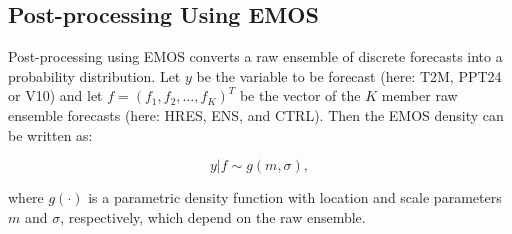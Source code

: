 \subsection{Post-processing Using EMOS}
Post-processing using EMOS converts a raw ensemble of discrete
forecasts into a probability distribution. Let $y$ be the variable to
be forecast (here: T2M, PPT24 or V10) and let ${f}=(f_{1}, f_{2},
\dots, f_{K})^{T}$ be the vector of the $K$ member raw ensemble
forecasts (here: HRES, ENS, and CTRL). Then the EMOS
density can be written as:
\begin{linenomath*}
\begin{equation}
y|{f} \sim g(m, \sigma),
\end{equation}
\end{linenomath*}
where $g(\cdot)$ is a parametric density function with location and
scale parameters $m$ and $\sigma$, respectively, which depend on the
raw ensemble.


